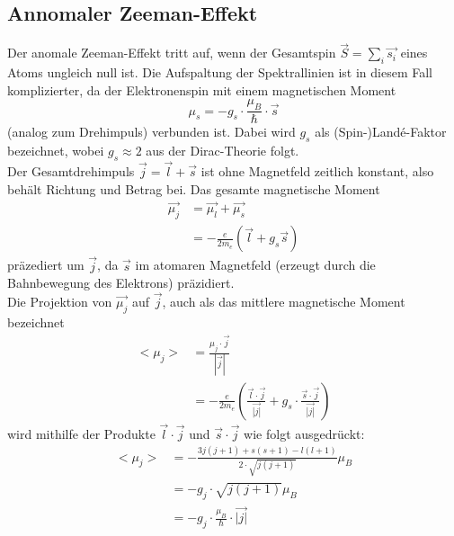 \subsection{Annomaler Zeeman-Effekt}
Der anomale Zeeman-Effekt tritt auf, wenn der Gesamtspin $\vec{S} = \sum_i \vec{s_i}$ eines Atoms ungleich null ist.
Die Aufspaltung der Spektrallinien ist in diesem Fall komplizierter, da der Elektronenspin mit einem magnetischen Moment
\begin{equation}
    \mu_s = -g_s \cdot \frac{\mu_B}{\hbar} \cdot \vec{s}
    \label{eqn:lande_s}
\end{equation}
(analog zum Drehimpuls) verbunden ist.
Dabei wird $g_s$ als (Spin-)Landé-Faktor bezeichnet, wobei $g_s \approx 2$ aus der Dirac-Theorie folgt.
\\
Der Gesamtdrehimpuls $\vec{j} = \vec{l} + \vec{s}$ ist ohne Magnetfeld zeitlich konstant, also behält Richtung und Betrag bei.
Das gesamte magnetische Moment
\begin{align}
    \vec{\mu_j} &= \vec{\mu_l} + \vec{\mu_s} \\
    &= - \frac{e}{2m_e}(\vec{l} + g_s \vec{s})
\end{align}
präzediert um $\vec{j}$, da $\vec{s}$ im atomaren Magnetfeld (erzeugt durch die Bahnbewegung des Elektrons) präzidiert.
\\
Die Projektion von $\vec{\mu_j}$ auf $\vec{j}$, auch als das mittlere magnetische Moment bezeichnet
\begin{align}
    <\mu_j> &= \frac{\mu_j \cdot \vec{j}}{|\vec{j}|}\\
    &= -\frac{e}{2m_e} \left ( \frac{\vec{l} \cdot \vec{j}}{\vec{|j|}} + g_s \cdot \frac{\vec{s} \cdot \vec{j}}{\vec{|j|}} \right )
\end{align}
wird mithilfe der Produkte $\vec{l} \cdot \vec{j}$ und $\vec{s} \cdot \vec{j}$ wie folgt ausgedrückt:
\begin{align}
    <\mu_j> &= - \frac{3j(j+1) + s(s+1) - l(l+1)}{2 \cdot \sqrt{j(j+1)}} \mu_B \\
    &= - g_j \cdot \sqrt{j(j+1)} \mu_B \\
    &= - g_j \cdot \frac{\mu_B}{\hbar} \cdot \vec{|j|}
\end{align}


